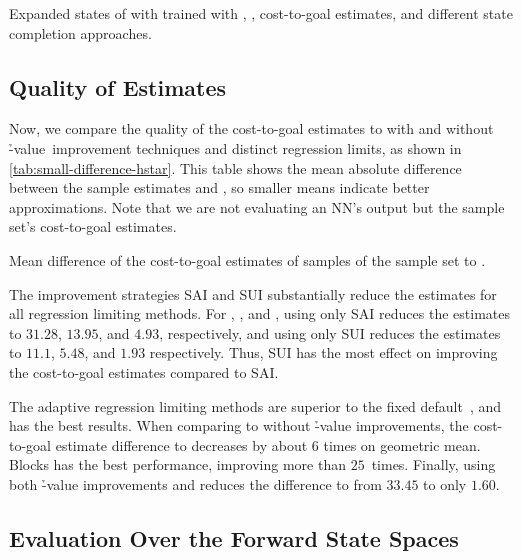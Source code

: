 \begin{table}[tb]
    \caption[Expanded states from different state completion approaches.]{Expanded states of \gbfs with \hnn trained with \bfsrw, \rlmeanfx, \hstar cost-to-goal estimates, and different state completion approaches.}
    \label{tab:small-state-completion}
    \addmargin
    \centering
    
\end{table}

\subsection{Quality of Estimates}
\label{sec:small-exps-hvalue-quality}

Now, we compare the quality of the cost-to-goal estimates to \hstar with and without \h-value~improvement techniques and distinct regression limits, as shown in \cref{tab:small-difference-hstar}. This table shows the mean absolute difference between the sample estimates and \hstar, so smaller means indicate better approximations. Note that we are not evaluating an NN's output but the sample set's cost-to-goal estimates.

\begin{table}[tb]
    \caption[Mean difference of the cost-to-goal estimates to \hstar.]{Mean difference of the cost-to-goal estimates of samples of the sample set to \hstar.}
    \label{tab:small-difference-hstar}
    \addmargin
    \centering
    
\end{table}

The improvement strategies SAI and SUI substantially reduce the estimates for all regression limiting methods. For \rldefault, \rlfacts, and \rlmeanfx, using only SAI reduces the estimates to $31.28$, $13.95$, and $4.93$, respectively, and using only SUI reduces the estimates to $11.1$, $5.48$, and $1.93$ respectively. Thus, SUI has the most effect on improving the cost-to-goal estimates compared to SAI.

The adaptive regression limiting methods are superior to the fixed default~\rldefault, and \rlmeanfx has the best results. When comparing \rldefault to \rlmeanfx without \h-value improvements, the cost-to-goal estimate difference to \hstar decreases by about $6$ times on geometric mean. Blocks has the best performance, improving more than $25$~times. Finally, using both \h-value improvements and \rlmeanfx reduces the difference to \hstar from $33.45$ to only $1.60$.

\subsection{Evaluation Over the Forward State Spaces}
\label{sec:small-exps-hvalue-fss}

